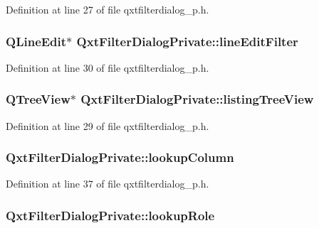 Definition at line 27 of file qxtfilterdialog\-\_\-p.\-h.

\hypertarget{class_qxt_filter_dialog_private_a918b1db4ce1899beb698d1a283ee4362}{
\subsubsection[{line\-Edit\-Filter}]{\setlength{\rightskip}{0pt plus 5cm}Q\-Line\-Edit$\ast$ Qxt\-Filter\-Dialog\-Private\-::line\-Edit\-Filter}}\label{class_qxt_filter_dialog_private_a918b1db4ce1899beb698d1a283ee4362}


Definition at line 30 of file qxtfilterdialog\-\_\-p.\-h.

\hypertarget{class_qxt_filter_dialog_private_a27b456f64e9f4984c92ea7600cf72d7d}{
\subsubsection[{listing\-Tree\-View}]{\setlength{\rightskip}{0pt plus 5cm}Q\-Tree\-View$\ast$ Qxt\-Filter\-Dialog\-Private\-::listing\-Tree\-View}}\label{class_qxt_filter_dialog_private_a27b456f64e9f4984c92ea7600cf72d7d}


Definition at line 29 of file qxtfilterdialog\-\_\-p.\-h.

\hypertarget{class_qxt_filter_dialog_private_ac61ac4e3ea393816bb28589ba85133cd}{
\subsubsection[{lookup\-Column}]{ Qxt\-Filter\-Dialog\-Private\-::lookup\-Column}}\label{class_qxt_filter_dialog_private_ac61ac4e3ea393816bb28589ba85133cd}


Definition at line 37 of file qxtfilterdialog\-\_\-p.\-h.

\hypertarget{class_qxt_filter_dialog_private_a81c1d2407302c80a8c04f6dfc66451e0}{
\subsubsection[{lookup\-Role}]{ Qxt\-Filter\-Dialog\-Private\-::lookup\-Role}}\label{class_qxt_filter_dialog_private_a81c1d2407302c80a8c04f6dfc66451e0}


